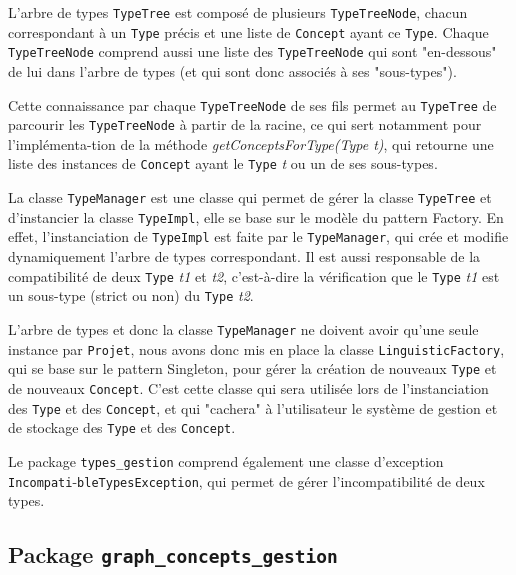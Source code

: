 \documentclass[12pt]{report}
\begin{document}
L'arbre de types \texttt{TypeTree} est composé de plusieurs \texttt{TypeTreeNode}, chacun correspondant à un \texttt{Type} précis et une liste de \texttt{Concept} ayant ce \texttt{Type}. Chaque \texttt{TypeTreeNode} comprend aussi une liste des \texttt{TypeTreeNode} qui sont "en-dessous" de lui dans l'arbre de types (et qui sont donc associés à ses "sous-types").

Cette connaissance par chaque \texttt{TypeTreeNode} de ses fils permet au \texttt{TypeTree} de parcourir les \texttt{TypeTreeNode} à partir de la racine, ce qui sert notamment pour l'implémenta-tion de la méthode \emph{getConceptsForType(Type t)}, qui retourne une liste des instances de \texttt{Concept} ayant le \texttt{Type} \emph{t} ou un de ses sous-types.

\bigskip

La classe \texttt{TypeManager} est une classe qui permet de gérer la classe \texttt{TypeTree} et d'instancier la classe \texttt{TypeImpl}, elle se base sur le modèle du pattern Factory. En effet, l'instanciation de \texttt{TypeImpl} est faite par le \texttt{TypeManager}, qui crée et modifie dynamiquement l'arbre de types correspondant. Il est aussi responsable de la compatibilité de deux \texttt{Type} \emph{t1} et \emph{t2}, c'est-à-dire la vérification que le \texttt{Type} \emph{t1} est un sous-type (strict ou non) du \texttt{Type} \emph{t2}.

\bigskip

L'arbre de types et donc la classe \texttt{TypeManager} ne doivent avoir qu'une seule instance par \texttt{Projet}, nous avons donc mis en place la classe \texttt{LinguisticFactory}, qui se base sur le pattern Singleton, pour gérer la création de nouveaux \texttt{Type} et de nouveaux \texttt{Concept}. C'est cette classe qui sera utilisée lors de l'instanciation des \texttt{Type} et des \texttt{Concept}, et qui "cachera" à l'utilisateur le système de gestion et de stockage des \texttt{Type} et des \texttt{Concept}.

\bigskip

Le package \texttt{types\_gestion} comprend également une classe d'exception \texttt{Incompati}-\texttt{bleTypesException}, qui permet de gérer l'incompatibilité de deux types.

\subsection{Package \texttt{graph\_concepts\_gestion}}
\end{document}
